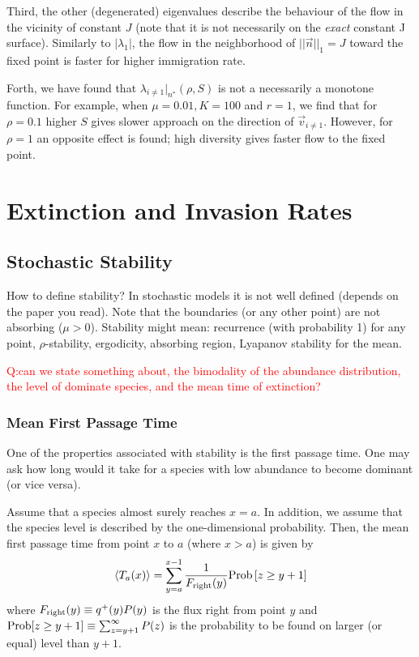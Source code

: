 \documentclass[9pt,lineno]{elife}
\begin{document}
Third, the other (degenerated) eigenvalues describe the behaviour of the flow in the vicinity of constant $J$ (note that it is not necessarily on the {\em exact} constant J surface). Similarly to $|\lambda_1|$, the flow in the neighborhood of $||\vec{n}||_1=J$ toward the fixed point is faster for higher immigration rate. 

Forth, we have found that $\lambda_{i\neq 1}|_{n^*}(\rho,S)$ is not a necessarily a monotone function. For example, when $\mu=0.01, K=100$ and $r=1$, we find that for $\rho=0.1$ higher $S$ gives slower approach on the direction of $\vec{v}_{i\neq 1}$. However, for $\rho=1$ an opposite effect is found; high diversity gives faster flow to the fixed point.   



\section{Extinction and Invasion Rates}

\subsection{Stochastic Stability}

How to define stability? In stochastic models it is not well defined (depends on the paper you read). Note that the boundaries (or any other point) are not absorbing ($\mu>0$). Stability might mean: recurrence (with probability 1) for any point, $\rho$-stability, ergodicity, absorbing region, Lyapanov stability for the mean.   

\textcolor{red}{Q:can we state something about, the bimodality of the abundance distribution,  the level of dominate species, and the mean time of extinction?  }

\subsubsection{Mean First Passage Time}
One of the properties associated with stability is the first passage time. One may ask how long would it take for a species with low abundance to become dominant (or vice versa). 

Assume that a species almost surely reaches $x=a$. In addition, we assume that the species level is described by the one-dimensional probability. Then, the mean first passage time from point $x$ to $a$ (where $x>a$) is given by 
\begin{equation}
   \langle T_a(x) \rangle =   \sum_{y=a}^{x-1}\frac{1}{F_{\rm right}(y)}{\rm Prob}\left[z\geq y+1\right] \label{eq:MFPT}
\end{equation}
where $F_{\rm right}(y)\equiv q^+(y)P(y)$ is the flux right from point $y$ and ${\rm Prob}[z\geq y+1]\equiv \sum_{z=y+1}^{\infty}P(z)$ is the probability to be found on larger (or equal) level than $y+1$.
\end{document}
